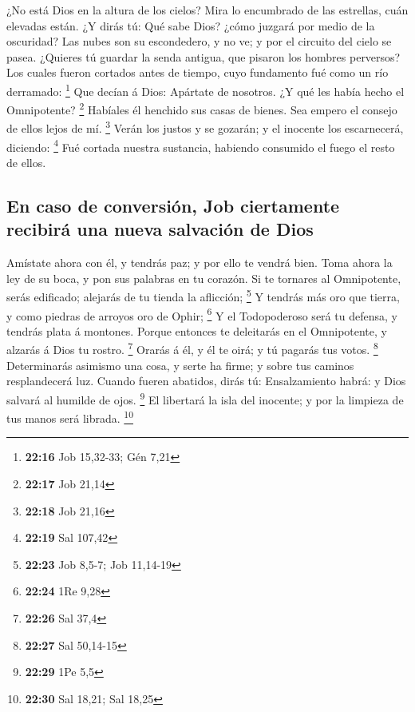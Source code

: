  ¿No está Dios en la altura de los cielos? Mira lo
encumbrado de las estrellas, cuán elevadas están.  ¿Y
dirás tú: Qué sabe Dios? ¿cómo juzgará por medio de la oscuridad?
 Las nubes son su escondedero, y no ve; y por el circuito
del cielo se pasea.  ¿Quieres tú guardar la senda
antigua, que pisaron los hombres perversos?  Los cuales
fueron cortados antes de tiempo, cuyo fundamento fué como un río
derramado: \footnote{\textbf{22:16} Job 15,32-33; Gén 7,21}
 Que decían á Dios: Apártate de nosotros. ¿Y qué les
había hecho el Omnipotente? \footnote{\textbf{22:17} Job 21,14}
 Habíales él henchido sus casas de bienes. Sea empero el
consejo de ellos lejos de mí. \footnote{\textbf{22:18} Job 21,16}
 Verán los justos y se gozarán; y el inocente los
escarnecerá, diciendo: \footnote{\textbf{22:19} Sal 107,42}
 Fué cortada nuestra sustancia, habiendo consumido el
fuego el resto de ellos.

\hypertarget{en-caso-de-conversiuxf3n-job-ciertamente-recibiruxe1-una-nueva-salvaciuxf3n-de-dios}{%
\subsection{En caso de conversión, Job ciertamente recibirá una nueva
salvación de
Dios}\label{en-caso-de-conversiuxf3n-job-ciertamente-recibiruxe1-una-nueva-salvaciuxf3n-de-dios}}

 Amístate ahora con él, y tendrás paz; y por ello te
vendrá bien.  Toma ahora la ley de su boca, y pon sus
palabras en tu corazón.  Si te tornares al Omnipotente,
serás edificado; alejarás de tu tienda la aflicción; \footnote{\textbf{22:23}
  Job 8,5-7; Job 11,14-19}  Y tendrás más oro que tierra,
y como piedras de arroyos oro de Ophir; \footnote{\textbf{22:24} 1Re
  9,28}  Y el Todopoderoso será tu defensa, y tendrás
plata á montones.  Porque entonces te deleitarás en el
Omnipotente, y alzarás á Dios tu rostro. \footnote{\textbf{22:26} Sal
  37,4}  Orarás á él, y él te oirá; y tú pagarás tus
votos. \footnote{\textbf{22:27} Sal 50,14-15} 
Determinarás asimismo una cosa, y serte ha firme; y sobre tus caminos
resplandecerá luz.  Cuando fueren abatidos, dirás tú:
Ensalzamiento habrá: y Dios salvará al humilde de ojos. \footnote{\textbf{22:29}
  1Pe 5,5}  El libertará la isla del inocente; y por la
limpieza de tus manos será librada. \footnote{\textbf{22:30} Sal 18,21;
  Sal 18,25}

